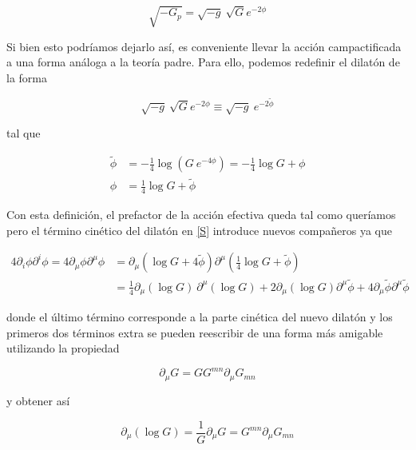 \documentclass{article}
\numberwithin{equation}{section}
\begin{document}
\begin{equation}
\sqrt{-G_p} = \sqrt{-g} \ \sqrt{G}  e^{-2 \phi} 
\end{equation}

Si bien esto podríamos dejarlo así, es conveniente llevar la acción campactificada a una forma análoga a la teoría padre. Para ello, podemos redefinir el dilatón de la forma

\begin{equation}
\sqrt{-g} \ \sqrt{G}  e^{-2 \phi} \equiv \sqrt{-g} \ e^{-2 \widetilde{\phi} }
\end{equation}

tal que

\begin{equation}
\begin{aligned}
\widetilde{\phi} &= -\frac{1}{4} \log \left( G \ e^{-4 \phi}\right) = -\frac{1}{4} \log G + \phi \\
\phi &= \frac{1}{4} \log G + \widetilde{\phi}
\end{aligned}
\end{equation}

Con esta definición, el prefactor de la acción efectiva queda tal como queríamos pero el término cinético del dilatón en \ref{S} introduce nuevos compañeros ya que 

\begin{equation}
\begin{aligned}
4 \partial_i \phi \partial^i \phi = 4 \partial_{\mu} \phi \partial^{\mu} \phi &= \partial_{\mu} \left( \log G + 4\widetilde{\phi} \right) \partial^{\mu} \left( \frac{1}{4} \log G + \widetilde{\phi} \right)\\
&=\frac{1}{4} \partial_{\mu} \left(\log G\right) \ \partial^{\mu} \left(\log G\right) + 2 \partial_{\mu} \left(\log G\right) \partial^{\mu} \widetilde{\phi} + 4 \partial_{\mu} \widetilde{\phi} \partial^{\mu} \widetilde{\phi}
\end{aligned}
\end{equation} 

donde el último término corresponde a la parte cinética del nuevo dilatón y los primeros dos términos extra se pueden reescribir de una forma más amigable utilizando la propiedad 

\begin{equation}
\partial_{\mu} G = G G^{m n} \partial_{\mu}G_{m n}
\end{equation} 

y obtener así

\begin{equation}
\partial_{\mu} \left( \log G\right) = \frac{1}{G} \partial_{\mu} G = G^{m n} \partial_{\mu} G_{m n}
\end{equation}
\end{document}
